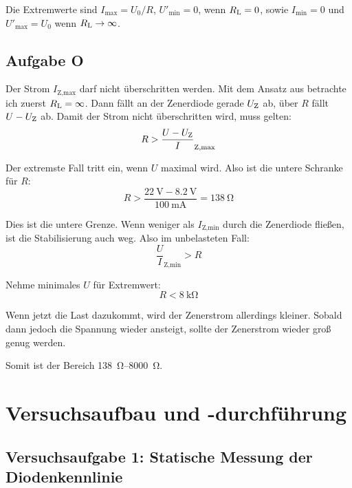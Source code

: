 Die Extremwerte sind $I_\text{max} = U_0/R$, $U'_\text{min} = 0$, wenn
$R_\text L = 0$, sowie $I_\text{min} = 0$ und $U'_\text{max} = U_0$ wenn $R_\text L \to \infty$.

\subsection{Aufgabe O}

\newcommand\IZmax{I_\text{Z,max}}
\newcommand\IZmin{I_\text{Z,min}}
\newcommand\IZ{I_\text Z}
\newcommand\UZ{U_\text Z}

Der Strom $\IZmax$ darf nicht überschritten werden. Mit dem Ansatz aus 
\cite[§~15.1.3]{beuth/elementare_elektronik} betrachte ich zuerst $R_\text L =
\infty$. Dann fällt an der Zenerdiode gerade $\UZ$ ab, über $R$ fällt $U - \UZ$
ab. Damit der Strom nicht überschritten wird, muss gelten:
\[
	R > \frac{U - \UZ}\IZmax
\]


Der extremste Fall tritt ein, wenn $U$ maximal wird. Also ist die untere
Schranke für $R$:
\[
	R > \frac{\SI{22}\volt - \SI{8.2}\volt}{\SI{100}{\milli\ampere}}
	= \SI{138}\ohm
\]

Dies ist die untere Grenze. Wenn weniger als $\IZmin$ durch die Zenerdiode
fließen, ist die Stabilisierung auch weg. Also im unbelasteten Fall:
\[
	\frac U\IZmin > R
\]

Nehme minimales $U$ für Extremwert:
\[
	R < \SI{8}{\kilo\ohm}
\]

Wenn jetzt die Last dazukommt, wird der Zenerstrom allerdings kleiner. Sobald
dann jedoch die Spannung wieder ansteigt, sollte der Zenerstrom wieder groß
genug werden.

Somit ist der Bereich \SIrange{138}{8000}{\ohm}.


\section{Versuchsaufbau und -durchführung}

\subsection{Versuchsaufgabe 1: Statische Messung der Diodenkennlinie}

